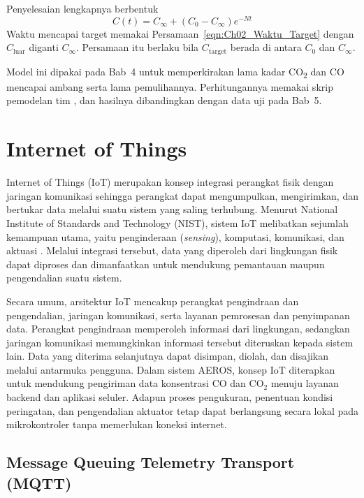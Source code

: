    Penyelesaian lengkapnya berbentuk
    \begin{equation}
        \label{eqn:Ch02_Penyelesaian_Umum}
        C(t) = C_{\infty} + \left(C_{0} - C_{\infty}\right)e^{-Nt}
    \end{equation}
    Waktu mencapai target memakai Persamaan~\ref{eqn:Ch02_Waktu_Target} dengan $C_{\text{luar}}$ diganti $C_{\infty}$. Persamaan itu berlaku bila $C_{\text{target}}$ berada di antara $C_{0}$ dan $C_{\infty}$.

    Model ini dipakai pada Bab~4 untuk memperkirakan lama kadar CO\textsubscript{2} dan CO mencapai ambang serta lama pemulihannya. Perhitungannya memakai skrip pemodelan tim \cite{skrip_pemodelan}, dan hasilnya dibandingkan dengan data uji pada Bab~5.

\section{Internet of Things}
\label{sec:Internet_of_Things}

  
Internet of Things (IoT) merupakan konsep integrasi perangkat fisik dengan jaringan komunikasi sehingga perangkat dapat mengumpulkan, mengirimkan, dan bertukar data melalui suatu sistem yang saling terhubung. Menurut National Institute of Standards and Technology (NIST), sistem IoT melibatkan sejumlah kemampuan utama, yaitu penginderaan (\textit{sensing}), komputasi, komunikasi, dan aktuasi \cite{nist_iot}. Melalui integrasi tersebut, data yang diperoleh dari lingkungan fisik dapat diproses dan dimanfaatkan untuk mendukung pemantauan maupun pengendalian suatu sistem.

Secara umum, arsitektur IoT mencakup perangkat pengindraan dan pengendalian, jaringan komunikasi, serta layanan pemrosesan dan penyimpanan data. Perangkat pengindraan memperoleh informasi dari lingkungan, sedangkan jaringan komunikasi memungkinkan informasi tersebut diteruskan kepada sistem lain. Data yang diterima selanjutnya dapat disimpan, diolah, dan disajikan melalui antarmuka pengguna. Dalam sistem AEROS, konsep IoT diterapkan untuk mendukung pengiriman data konsentrasi CO dan CO$_2$ menuju layanan backend dan aplikasi seluler. Adapun proses pengukuran, penentuan kondisi peringatan, dan pengendalian aktuator tetap dapat berlangsung secara lokal pada mikrokontroler tanpa memerlukan koneksi internet.

\subsection{Message Queuing Telemetry Transport (MQTT)}

